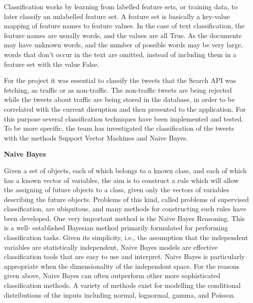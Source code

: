 Classification works by learning from labelled feature sets, or training data, to later classify an unlabelled feature set. A feature set is basically a key-value mapping of feature names to feature values. In the case of text classification, the feature names are usually words, and the values are all True. As the documents may have unknown words, and the number of possible words may be very large, words that don't occur in the text are omitted, instead of including them in a feature set with the value False.

For the project it was essential to classify the tweets that the Search API was fetching, as traffic or as non-traffic. The non-traffic tweets are being rejected while the tweets about traffic are being stored in the database, in order to be correlated with the current disruption and then presented to the application. For this purpose several classification techniques have been implemented and tested. To be more specific, the team has investigated the classification of the tweets with the methods Support Vector Machines and Naive Bayes. 

\textbf{Naive Bayes}

Given a set of objects, each of which belongs to a known class, and each of which has a known vector of variables, the aim is to construct a rule which will allow the assigning of future objects to a class, given only the vectors of variables describing the future objects. Problems of this kind, called problems of supervised classification, are ubiquitous, and many methods for constructing such rules have been developed. One very important method is the Naive Bayes Reasoning. This is a well- established Bayesian method primarily formulated for performing classification tasks. Given its simplicity, i.e., the assumption that the independent variables are statistically independent, Naive Bayes models are effective classification tools that are easy to use and interpret. Naive Bayes is particularly appropriate when the dimensionality of the independent space. For the reasons given above, Naive Bayes can often outperform other more sophisticated classification methods. A variety of methods exist for modelling the conditional distributions of the inputs including normal, lognormal, gamma, and Poisson. 

